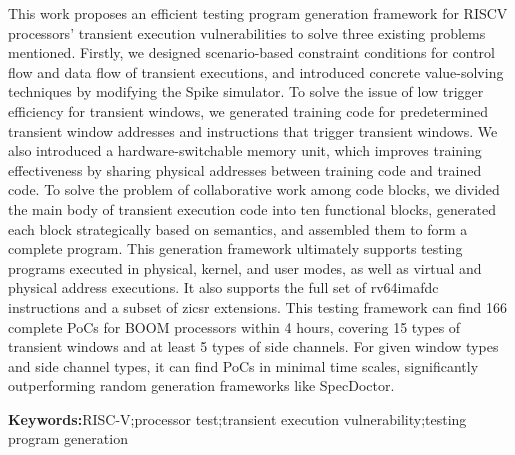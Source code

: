 This work proposes an efficient testing program generation framework for RISCV processors' transient execution vulnerabilities
to solve three existing problems mentioned.
Firstly, we designed scenario-based constraint conditions for control flow and data flow of transient executions, 
and introduced concrete value-solving techniques by modifying the Spike simulator.
To solve the issue of low trigger efficiency for transient windows, 
we generated training code for predetermined transient window addresses and instructions that trigger transient windows.
We also introduced a hardware-switchable memory unit,
which improves training effectiveness by sharing physical addresses between training code and trained code.
To solve the problem of collaborative work among code blocks, 
we divided the main body of transient execution code into ten functional blocks, 
generated each block strategically based on semantics, 
and assembled them to form a complete program.
This generation framework ultimately supports testing programs executed in physical, kernel, and user modes, 
as well as virtual and physical address executions. 
It also supports the full set of rv64imafdc instructions and a subset of zicsr extensions. 
This testing framework can find 166 complete PoCs for BOOM processors within 4 hours, 
covering 15 types of transient windows and at least 5 types of side channels. 
For given window types and side channel types, it can find PoCs in minimal time scales, 
significantly outperforming random generation frameworks like SpecDoctor.\par

\textbf{Keywords:}RISC-V;processor test;transient execution vulnerability;testing program generation



